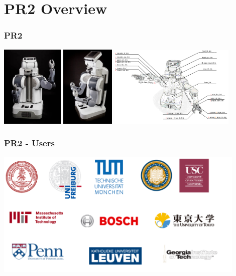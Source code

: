 \section{PR2 Overview}
\begin{frame}
  \frametitle{PR2}
\hspace{-3ex}\includegraphics[width=3cm]{img/PR2_front.jpeg} 
\includegraphics[width=2.57cm]{img/PR2_side.jpeg} 
\includegraphics[width=6cm]{img/pr2_link_name.png}
\end{frame}

\begin{frame}
  \frametitle{PR2 - Users}
\centering\includegraphics[width=12cm]{img/pr2_users.pdf} 
\end{frame}

